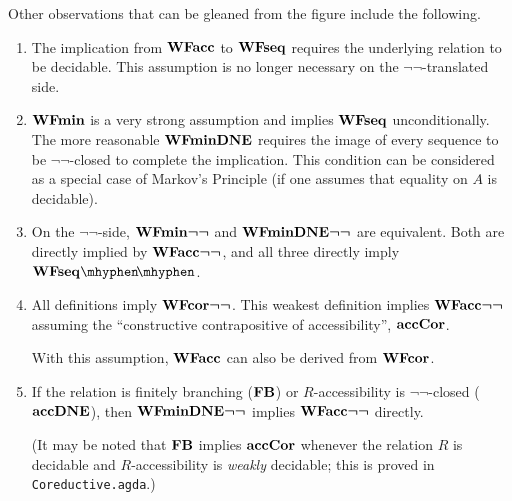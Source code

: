 Other observations that can be gleaned from the figure include the following.
\begin{enumerate}
  \item The implication from $\mathbf{WFacc}$ to $\mathbf{WFseq}$ requires the underlying relation to be decidable.
    This assumption is no longer necessary on the $\lnot\lnot$-translated side.
  \item $\mathbf{WFmin}$ is a very strong assumption and implies $\mathbf{WFseq}$ unconditionally.
  The more reasonable $\mathbf{WFminDNE}$ requires the image of every sequence to be $\lnot\lnot$-closed
  to complete the implication.  This condition can be considered as a special case of Markov's Principle
  (if one assumes that equality on $A$ is decidable).
  \item On the $\lnot\lnot$-side, $\mathbf{WFmin}\boldsymbol{\lnot\lnot}$ and $\mathbf{WFminDNE}\boldsymbol{\lnot\lnot}$ are equivalent. Both are directly implied by $\mathbf{WFacc}\boldsymbol{\lnot\lnot}$,
    and all three directly imply $\WFseqm$.
  \item All definitions imply $\mathbf{WFcor}\boldsymbol{\lnot\lnot}$.  This weakest definition implies $\mathbf{WFacc}\boldsymbol{\lnot\lnot}$ assuming the
    ``constructive contrapositive of accessibility'', $\mathbf{accCor}$.

    With this assumption, $\mathbf{WFacc}$ can also be derived from $\mathbf{WFcor}$. %


  \item If the relation is finitely branching ($\mathbf{FB}$) or $R$-accessibility is $\lnot\lnot$-closed ($\mathbf{accDNE}$), then $\mathbf{WFminDNE}\boldsymbol{\lnot\lnot}$
    implies $\mathbf{WFacc}\boldsymbol{\lnot\lnot}$ directly.

    (It may be noted that $\mathbf{FB}$ implies $\mathbf{accCor}$ whenever the relation $R$ is decidable
    and $R$-accessibility is \emph{weakly} decidable;  this is proved in \texttt{Coreductive.agda}.)


\end{enumerate}
